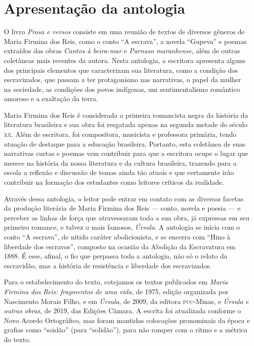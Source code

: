 \chapter{Apresentação da antologia}

O livro \emph{Prosa e versos} consiste em uma reunião de
textos de diversos gêneros de Maria Firmina dos Reis, como o conto ``A
escrava'', a novela ``Gupeva'' e poemas extraídos das obras \emph{Cantos
à beira-mar} e \emph{Parnaso maranhense}, além de outras coletâneas mais
recentes da autora. Nesta antologia, a escritora apresenta alguns dos
principais elementos que caracterizam sua literatura, como a condição
dos escravizados, que passam a ter protagonismo nas narrativas, o papel
da mulher na sociedade, as condições dos povos indígenas, um
sentimentalismo romântico amoroso e a exaltação da terra.

Maria Firmina dos Reis é considerada a primeira romancista negra da
história da literatura brasileira e sua obra foi resgatada apenas na
segunda metade do século \textsc{xx}. Além de escritora, foi compositora,
musicista e professora primária, tendo atuação de destaque para a
educação brasileira. Portanto, esta coletânea de suas narrativas curtas
e poemas vem contribuir para que a escritora ocupe o lugar que merece na
história da nossa literatura e da cultura brasileira, trazendo para a
escola a reflexão e discussão de temas ainda tão atuais e que certamente
irão contribuir na formação dos estudantes como leitores críticos da
realidade.

Através dessa antologia, o leitor pode entrar em contato com as diversas facetas da produção literária de Maria Firmina dos Reis --- conto, novela e poesia --- e perceber as linhas de força que atravessaram toda a sua obra, já expressas em seu primeiro romance, e talvez o mais famosos, \textit{Úrsula}. A antologia se inicia com o conto ``A escrava'', de nítido caráter abolicionista, e se encerra com ``Hino à liberdade dos escravos'', composto na ocasião da Abolição da Escravatura em 1888. É esse, afinal, o fio que perpassa toda a antologia, não só o relato da escravidão, mas a história de resistência e liberdade dos escravizados.

Para o estabelecimento do texto, cotejamos os textos publicados em
\emph{Maria Firmina dos Reis: fragmentos de uma vida}, de 1975, edição
organizada por Nascimento Morais Filho, e em \emph{Úrsula}, de 2009, da
editora \textsc{puc}-Minas, e \emph{Úrsula e outras obras}, de 2019, das Edições
Câmara. A escrita foi atualizada conforme o Novo Acordo Ortográfico, mas
foram mantidas colocações pronominais da época e grafias como ``soidão''
(para ``solidão''), para não romper com o ritmo e a métrica do texto.

